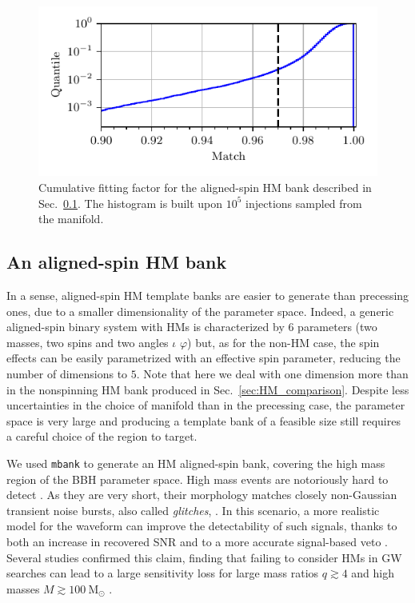 \documentclass[twocolumn,showpacs,preprintnumbers,nofootinbib,prd,
superscriptaddress,10pt]{revtex4-2}
\begin{document}
\begin{figure}[t]
	\centering
	\includegraphics[scale = 1.]{HM_hist}
	\caption{Cumulative fitting factor for the aligned-spin HM bank described in Sec.~\ref{sec:HM_spinning_bank}. The histogram is built upon $10^5$ injections sampled from the manifold.}
	\label{fig:HM_hist}
\end{figure}


\subsection{An aligned-spin HM bank} \label{sec:HM_spinning_bank}

In a sense, aligned-spin HM template banks are easier to generate than precessing ones, due to a smaller dimensionality of the parameter space. Indeed, a generic aligned-spin binary system with HMs is characterized by $6$ parameters (two masses, two spins and two angles $\iota$ $\varphi$) but, as for the non-HM case, the spin effects can be easily parametrized with an effective spin parameter, reducing the number of dimensions to $5$.
Note that here we deal with one dimension more than in the nonspinning HM bank produced in Sec.~\ref{sec:HM_comparison}.
Despite less uncertainties in the choice of manifold than in the precessing case, the parameter space is very large and producing a template bank of a feasible size still requires a careful choice of the region to target.

We used \texttt{mbank} to generate an HM aligned-spin bank, covering the high mass region of the BBH parameter space.
High mass events are notoriously hard to detect \cite{LIGOScientific:2021tfm, Chandra:2021wbw}. As they are very short, their morphology matches closely non-Gaussian transient noise bursts, also called {\it glitches}, \cite{Blackburn:2008ah, Zevin:2016qwy, LIGOScientific:2016gtq, LIGO:2021ppb}. In this scenario, a more realistic model for the waveform can improve the detectability of such signals, thanks to both an increase in recovered SNR and to a more accurate signal-based veto \cite{Babak:2005kv, PhysRevD.95.042001}.
Several studies \cite{Pekowsky:2012sr, Capano:2013raa, Varma:2014jxa, CalderonBustillo:2015lrt} confirmed this claim, finding that failing to consider HMs in GW searches can lead to a large sensitivity loss for large mass ratios $q\gtrsim 4$ and high masses $M \gtrsim \SI{100}{\mathrm{M_\odot}}$ \cite{CalderonBustillo:2016rlt}.
\end{document}

